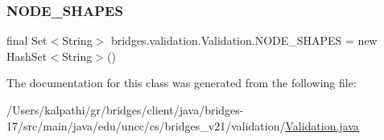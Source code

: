 \mbox{\label{classbridges_1_1validation_1_1_validation_a43f1f9efc20d0086b7fcfa9b40bd7146}} 
\subsubsection{\texorpdfstring{N\+O\+D\+E\+\_\+\+S\+H\+A\+P\+ES}{NODE\_SHAPES}}
{\footnotesize\ttfamily final Set$<$String$>$ bridges.\+validation.\+Validation.\+N\+O\+D\+E\+\_\+\+S\+H\+A\+P\+ES = new Hash\+Set$<$String$>$()\hspace{0.3cm}{\ttfamily [static]}}



The documentation for this class was generated from the following file\+:\begin{DoxyCompactItemize}
\item 
/\+Users/kalpathi/gr/bridges/client/java/bridges-\/17/src/main/java/edu/uncc/cs/bridges\+\_\+v21/validation/\mbox{\hyperlink{_validation_8java}{Validation.\+java}}\end{DoxyCompactItemize}
